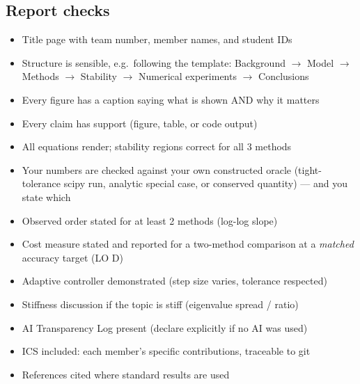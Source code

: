 \documentclass[11pt]{article}
\begin{document}
\subsection*{Report checks}
\begin{itemize}[leftmargin=2.4em, itemsep=1pt]
  \item[$\square$] Title page with team number, member names, and student IDs
  \item[$\square$] Structure is sensible, e.g.\ following the template:
    Background $\to$ Model $\to$ Methods $\to$ Stability $\to$ Numerical
    experiments $\to$ Conclusions
  \item[$\square$] Every figure has a caption saying what is shown AND why it matters
  \item[$\square$] Every claim has support (figure, table, or code output)
  \item[$\square$] All equations render; stability regions correct for all 3 methods
  \item[$\square$] Your numbers are checked against your own constructed oracle
    (tight-tolerance scipy run, analytic special case, or conserved quantity)
    --- and you state which
  \item[$\square$] Observed order stated for at least 2 methods (log-log slope)
  \item[$\square$] Cost measure stated and reported for a two-method comparison
    at a \emph{matched} accuracy target (LO D)
  \item[$\square$] Adaptive controller demonstrated (step size varies, tolerance respected)
  \item[$\square$] Stiffness discussion if the topic is stiff (eigenvalue spread / ratio)
  \item[$\square$] AI Transparency Log present (declare explicitly if no AI was used)
  \item[$\square$] ICS included: each member's specific contributions, traceable to git
  \item[$\square$] References cited where standard results are used
\end{itemize}

\end{document}
